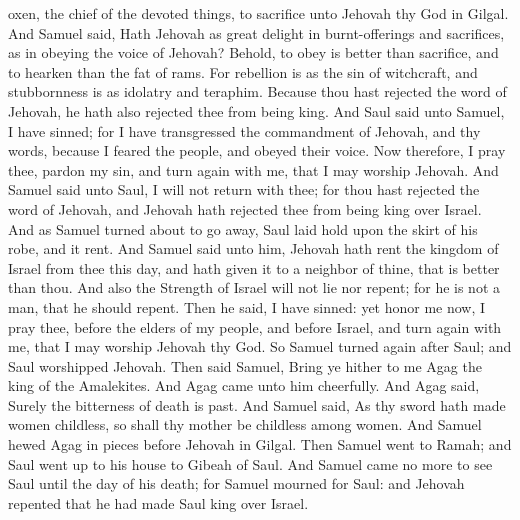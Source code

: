 oxen, the chief of the devoted things, to sacrifice unto Jehovah thy God in Gilgal. And Samuel said, Hath Jehovah as great delight in burnt-offerings and sacrifices, as in obeying the voice of Jehovah? Behold, to obey is better than sacrifice, and to hearken than the fat of rams. For rebellion is as the sin of witchcraft, and stubbornness is as idolatry and teraphim. Because thou hast rejected the word of Jehovah, he hath also rejected thee from being king.  And Saul said unto Samuel, I have sinned; for I have transgressed the commandment of Jehovah, and thy words, because I feared the people, and obeyed their voice. Now therefore, I pray thee, pardon my sin, and turn again with me, that I may worship Jehovah. And Samuel said unto Saul, I will not return with thee; for thou hast rejected the word of Jehovah, and Jehovah hath rejected thee from being king over Israel. And as Samuel turned about to go away, Saul laid hold upon the skirt of his robe, and it rent. And Samuel said unto him, Jehovah hath rent the kingdom of Israel from thee this day, and hath given it to a neighbor of thine, that is better than thou. And also the Strength of Israel will not lie nor repent; for he is not a man, that he should repent. Then he said, I have sinned: yet honor me now, I pray thee, before the elders of my people, and before Israel, and turn again with me, that I may worship Jehovah thy God. So Samuel turned again after Saul; and Saul worshipped Jehovah.  Then said Samuel, Bring ye hither to me Agag the king of the Amalekites. And Agag came unto him cheerfully. And Agag said, Surely the bitterness of death is past. And Samuel said, As thy sword hath made women childless, so shall thy mother be childless among women. And Samuel hewed Agag in pieces before Jehovah in Gilgal.  Then Samuel went to Ramah; and Saul went up to his house to Gibeah of Saul. And Samuel came no more to see Saul until the day of his death; for Samuel mourned for Saul: and Jehovah repented that he had made Saul king over Israel. 

